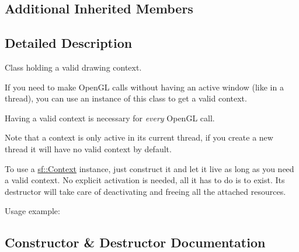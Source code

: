 \subsection*{Additional Inherited Members}


\subsection{Detailed Description}
Class holding a valid drawing context. 

\begin{DoxyVerb}\end{DoxyVerb}


If you need to make Open\+GL calls without having an active window (like in a thread), you can use an instance of this class to get a valid context.

Having a valid context is necessary for {\itshape every} Open\+GL call.

Note that a context is only active in its current thread, if you create a new thread it will have no valid context by default.

To use a \mbox{\hyperlink{classsf_1_1_context}{sf\+::\+Context}} instance, just construct it and let it live as long as you need a valid context. No explicit activation is needed, all it has to do is to exist. Its destructor will take care of deactivating and freeing all the attached resources.

Usage example\+: 
\begin{DoxyCode}{0}
\DoxyCodeLine{\{}
\DoxyCodeLine{   \textcolor{comment}{// from now on, you have a valid context}}
\DoxyCodeLine{}
\DoxyCodeLine{   \textcolor{comment}{// you can make OpenGL calls}}
\DoxyCodeLine{\}}
\DoxyCodeLine{\textcolor{comment}{// the context is automatically deactivated and destroyed}}
\DoxyCodeLine{\textcolor{comment}{// by the sf::Context destructor}}
\end{DoxyCode}
 \begin{DoxyVerb}\end{DoxyVerb}
 

\subsection{Constructor \& Destructor Documentation}
\mbox{\label{classsf_1_1_context_aba22797a790706ca2c5c04ee39f2b555}} 
